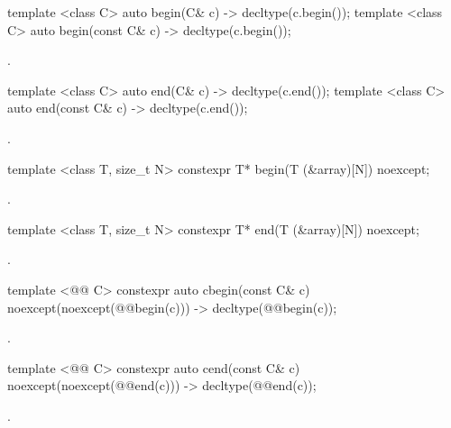 {\color{remclr}
%
\begin{itemdecl}
template <class C> auto begin(C& c) -> decltype(c.begin());
template <class C> auto begin(const C& c) -> decltype(c.begin());
\end{itemdecl}

\begin{itemdescr}
\pnum
\returns {}.
\end{itemdescr}

%
\begin{itemdecl}
template <class C> auto end(C& c) -> decltype(c.end());
template <class C> auto end(const C& c) -> decltype(c.end());
\end{itemdecl}

\begin{itemdescr}
\pnum
\returns {}.
\end{itemdescr}

%
\begin{itemdecl}
template <class T, size_t N> constexpr T* begin(T (&array)[N]) noexcept;
\end{itemdecl}

\begin{itemdescr}
\pnum
\returns {}.
\end{itemdescr}

%
\begin{itemdecl}
template <class T, size_t N> constexpr T* end(T (&array)[N]) noexcept;
\end{itemdecl}

\begin{itemdescr}
\pnum
\returns {}.
\end{itemdescr}
}

%
\begin{itemdecl}
template <@@ C> constexpr auto cbegin(const C& c) noexcept(noexcept(@@begin(c)))
  -> decltype(@@begin(c));
\end{itemdecl}
\begin{itemdescr}
\pnum \returns {}.
\end{itemdescr}

%
\begin{itemdecl}
template <@@ C> constexpr auto cend(const C& c) noexcept(noexcept(@@end(c)))
  -> decltype(@@end(c));
\end{itemdecl}
\begin{itemdescr}
\pnum \returns {}.
\end{itemdescr}

